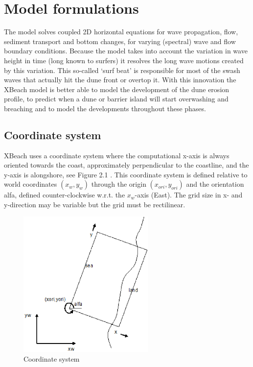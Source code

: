 \chapter{Model formulations}

The model solves coupled 2D horizontal equations for wave propagation, flow, sediment transport and bottom changes, for varying (spectral) wave and flow boundary conditions. Because the model takes into account the variation in wave height in time (long known to surfers) it resolves the long wave motions created by this variation. This so-called `surf beat' is responsible for most of the swash waves that actually hit the dune front or overtop it. With this innovation the XBeach model is better able to model the development of the dune erosion profile, to predict when a dune or barrier island will start overwashing and breaching and to model the developments throughout these phases.

\section{ Coordinate system}

XBeach uses a coordinate system where the computational x-axis is always oriented towards the coast, approximately perpendicular to the coastline, and the y-axis is alongshore, see Figure 2.1 . This coordinate system is defined relative to world coordinates $(x_{w},y_{w})$ through the origin $(x_{ori},y_{ori})$ and the orientation alfa, defined counter-clockwise w.r.t. the $x_{w}$-axis (East). The grid size in x- and y-direction may be variable but the grid must be rectilinear.

\begin{figure}[h]
  \centering
  \includegraphics[width=0.6\textwidth]{image1}
  \caption{Coordinate system}
  \label{fig:image1}
\end{figure}

